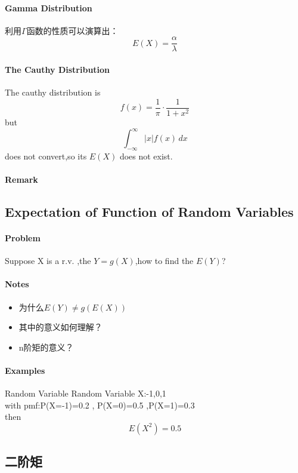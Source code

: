 \documentclass[12pt,a4paper]{ctexart}
\begin{document}
\paragraph{Gamma Distribution}
利用$ \Gamma  $函数的性质可以演算出：
\[ E \left(X\right)=\dfrac{\alpha}{\lambda} \]

\paragraph{The Cauthy Distribution}
The cauthy distribution is 
\[ f \left(x\right)=\dfrac{1}{\pi} \cdot \dfrac{1}{1+x^2}\]
but  \[ \int_{-\infty}^{\infty} \left|x\right| f \left(x\right) \, dx\]does not convert,so its $  E \left(X\right)$ does not exist.

\paragraph{Remark}

\subsection{Expectation of Function of Random Variables}

\paragraph{Problem}
Suppose X is a r.v. ,the $ Y=g \left(X\right) $,how to find the $ E \left(Y\right) $?

\paragraph{Notes}
\begin{itemize}
	\item 为什么$ E \left(Y\right)\neq g \left( E \left(X\right)\right) $
	\item 其中的意义如何理解？
	\item n阶矩的意义？
\end{itemize}
\paragraph{Examples}
Random Variable Random Variable X:{-1,0,1}\\
with pmf:P(X=-1)=0.2 , P(X=0)=0.5 ,P(X=1)=0.3\\
then\[ E \left(X^2\right)=0.5 \]

\subsection{二阶矩}
\end{document}
